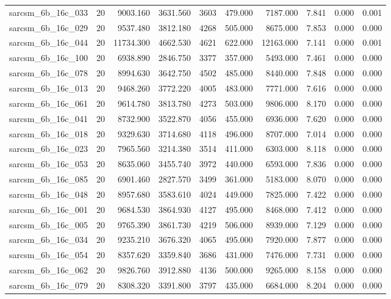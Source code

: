 \begin{tabular}{lrrrrrrrrr}
sarcsm\_6b\_16c\_033 & 20 & 9003.160 & 3631.560 & 3603 & 479.000 & 7187.000 & 7.841 & 0.000 & 0.001 \\
sarcsm\_6b\_16c\_029 & 20 & 9537.480 & 3812.180 & 4268 & 505.000 & 8675.000 & 7.853 & 0.000 & 0.000 \\
sarcsm\_6b\_16c\_044 & 20 & 11734.300 & 4662.530 & 4621 & 622.000 & 12163.000 & 7.141 & 0.000 & 0.001 \\
sarcsm\_6b\_16c\_100 & 20 & 6938.890 & 2846.750 & 3377 & 357.000 & 5493.000 & 7.461 & 0.000 & 0.000 \\
sarcsm\_6b\_16c\_078 & 20 & 8994.630 & 3642.750 & 4502 & 485.000 & 8440.000 & 7.848 & 0.000 & 0.000 \\
sarcsm\_6b\_16c\_013 & 20 & 9468.260 & 3772.220 & 4005 & 483.000 & 7771.000 & 7.616 & 0.000 & 0.000 \\
sarcsm\_6b\_16c\_061 & 20 & 9614.780 & 3813.780 & 4273 & 503.000 & 9806.000 & 8.170 & 0.000 & 0.000 \\
sarcsm\_6b\_16c\_041 & 20 & 8732.900 & 3522.870 & 4056 & 455.000 & 6936.000 & 7.620 & 0.000 & 0.000 \\
sarcsm\_6b\_16c\_018 & 20 & 9329.630 & 3714.680 & 4118 & 496.000 & 8707.000 & 7.014 & 0.000 & 0.000 \\
sarcsm\_6b\_16c\_023 & 20 & 7965.560 & 3214.380 & 3514 & 411.000 & 6303.000 & 8.118 & 0.000 & 0.000 \\
sarcsm\_6b\_16c\_053 & 20 & 8635.060 & 3455.740 & 3972 & 440.000 & 6593.000 & 7.836 & 0.000 & 0.000 \\
sarcsm\_6b\_16c\_085 & 20 & 6901.460 & 2827.570 & 3499 & 361.000 & 5183.000 & 8.070 & 0.000 & 0.000 \\
sarcsm\_6b\_16c\_048 & 20 & 8957.680 & 3583.610 & 4024 & 449.000 & 7825.000 & 7.422 & 0.000 & 0.000 \\
sarcsm\_6b\_16c\_001 & 20 & 9684.530 & 3864.930 & 4127 & 495.000 & 8468.000 & 7.412 & 0.000 & 0.000 \\
sarcsm\_6b\_16c\_005 & 20 & 9765.390 & 3861.730 & 4219 & 506.000 & 8939.000 & 7.129 & 0.000 & 0.000 \\
sarcsm\_6b\_16c\_034 & 20 & 9235.210 & 3676.320 & 4065 & 495.000 & 7920.000 & 7.877 & 0.000 & 0.000 \\
sarcsm\_6b\_16c\_054 & 20 & 8357.620 & 3359.840 & 3686 & 431.000 & 7476.000 & 7.731 & 0.000 & 0.000 \\
sarcsm\_6b\_16c\_062 & 20 & 9826.760 & 3912.880 & 4136 & 500.000 & 9265.000 & 8.158 & 0.000 & 0.000 \\
sarcsm\_6b\_16c\_079 & 20 & 8308.320 & 3391.800 & 3797 & 435.000 & 6684.000 & 8.204 & 0.000 & 0.000 \\

\end{tabular}
